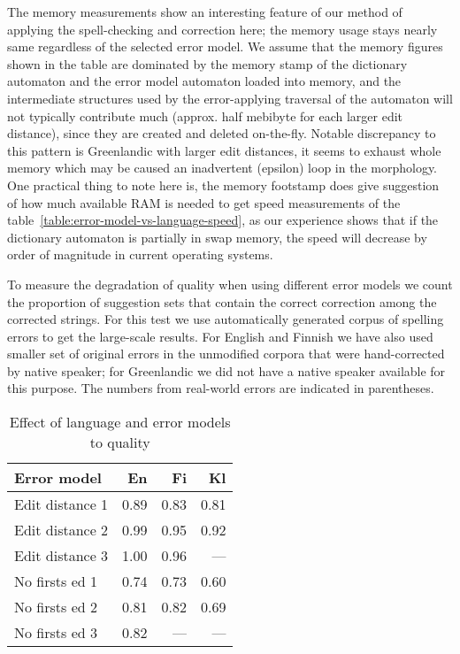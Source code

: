 \documentclass[11pt]{article}
\begin{document}
The memory measurements show an interesting feature of our method of applying
the spell-checking and correction here; the memory usage stays nearly same
regardless of the selected error model. We assume that the memory figures shown
in the table are dominated by the memory stamp of the dictionary automaton and
the error model automaton loaded into memory, and the intermediate structures
used by the error-applying traversal of the automaton will not typically
contribute much (approx. half mebibyte for each larger edit distance), since
they are created and deleted on-the-fly. Notable discrepancy to this pattern is
Greenlandic with larger edit distances, it seems to exhaust whole memory which
may be caused an inadvertent (epsilon) loop in the morphology. One practical
thing to note here is, the memory footstamp does give suggestion of how much
available RAM is needed to get speed measurements of the
table~\ref{table:error-model-vs-language-speed}, as our experience shows that
if the dictionary automaton is partially in swap memory, the speed will
decrease by order of magnitude in current operating systems.

To measure the degradation of quality when using different error models we
count the proportion of suggestion sets that contain the correct correction
among the corrected strings. For this test we use automatically generated corpus
of spelling errors to get the large-scale results. For English and Finnish we
have also used smaller set of original errors in the unmodified corpora that
were hand-corrected by native speaker; for Greenlandic we did not have a native
speaker available for this purpose. The numbers from real-world errors are 
indicated in parentheses.

\begin{table}[h]
\begin{center}
\begin{scriptsize}
\begin{tabular}{|l|rrr|}
\hline
\bf Error model & \bf En & \bf Fi & \bf Kl\\ 
\hline
\hline
\hline
Edit distance 1 &
0.89&0.83&0.81
\\
Edit distance 2 &
0.99&0.95&0.92
\\
Edit distance 3 &
1.00&0.96&---
\\
No firsts ed 1 & 
0.74&0.73&0.60
\\
No firsts ed 2 &
0.81&0.82&0.69
\\
No firsts ed 3 &
0.82&---&---
\\
\hline
\end{tabular}
\end{scriptsize}
\end{center}
\caption{\label{table:error-model-vs-language} Effect of language and 
error models to quality}
\end{table}
\end{document}

